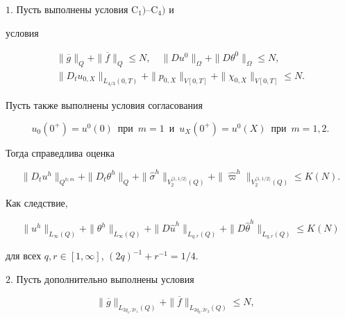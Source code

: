 \begin{thms} $1.$ Пусть выполнены условия $\mathrm C_1)$--$\mathrm C_4)$ и


условия


\begin{gather}


\|\overline g\|_Q+\|\overline f\|_Q\le N,\quad


\|Du^0\|_{\Omega}+\|D\theta^0\|_{\Omega}\le N,\\


\|D_tu_{0,X}\|_{L_{4/3}(0,T)}+\|p_{0,X}\|_{V[0,T]}


+\|\chi_{0,X}\|_{V[0,T]}\le N.


\end{gather}


Пусть также выполнены условия согласования


\begin{equation}


u_0(0^+)=u^0(0)\ \; \text{при}\ \; m=1


\ \;\text{и}\ \; u_X(0^+)=u^0(X)\ \; \text{при}\ \; m=1,2.


\end{equation}


Тогда справедлива оценка


$$


\|D_tu^h\|_{Q^{h;m}}+\|D_t\theta^h\|_Q+


\|\widehat\sigma^h\|_{V_2^{\langle1,1/2\rangle}(Q)}+


\|\widehat\varpi^h\|_{V_2^{\langle1,1/2\rangle}(Q)} \le K(N).


$$


Как следствие,


$$


\|u^h\|_{L_\infty(Q)}+\|\theta^h\|_{L_\infty(Q)}+


\|D\widehat u^h\|_{L_{q,r}(Q)}+\|D\widehat\theta^h\|_{L_{q,r}(Q)}\le K(N)


$$


для всех $q,r\in [1,\infty]$, $(2q)^{-1}+r^{-1}=1/4$.








$2.$ Пусть дополнительно выполнены условия


\begin{equation}


\|\overline g\|_{L_{2q_1,2r_1}(Q)}+


\|\overline f\|_{L_{2q_2,2r_2}(Q)}\le N,\quad



\end{equation}
\end{thms}
